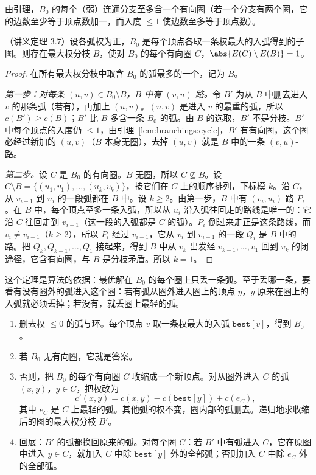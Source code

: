 由引理，$B_0$ 的每个（弱）连通分支至多含一个有向圈（若一个分支有两个圈，它的边数至少等于顶点数加一，而入度 $\leqslant1$ 使边数至多等于顶点数）。

\begin{theorem}\label{thm:branchings:one-arc}
（讲义定理 3.7）设各弧权为正，$B_0$ 是每个顶点各取一条权最大的入弧得到的子图。则存在最大权分枝 $B$，使对 $B_0$ 的每个有向圈 $C$，$\abs{E(C)\setminus E(B)}=1$。
\end{theorem}
\begin{proof}
在所有最大权分枝中取含 $B_0$ 的弧最多的一个，记为 $B$。

\emph{第一步：对每条 $(u,v)\in B_0\setminus B$，$B$ 中有 $(v,u)$-路。}令 $B'$ 为从 $B$ 中删去进入 $v$ 的那条弧（若有），再加上 $(u,v)$。$(u,v)$ 是进入 $v$ 的最重的弧，所以 $c(B')\geqslant c(B)$；$B'$ 比 $B$ 多含一条 $B_0$ 的弧。由 $B$ 的选取，$B'$ 不是分枝。$B'$ 中每个顶点的入度仍 $\leqslant1$，由引理~\ref{lem:branchings:cycle}，$B'$ 有有向圈，这个圈必经过新加的 $(u,v)$（$B$ 本身无圈），去掉 $(u,v)$ 就是 $B$ 中的一条 $(v,u)$-路。

\emph{第二步。}设 $C$ 是 $B_0$ 的有向圈。$B$ 无圈，所以 $C\not\subseteq B$。设 $C\setminus B=\{(u_1,v_1),\dots,(u_k,v_k)\}$，按它们在 $C$ 上的顺序排列，下标模 $k$。沿 $C$，从 $v_{i-1}$ 到 $u_i$ 的一段弧都在 $B$ 中。设 $k\geqslant2$。由第一步，$B$ 中有 $(v_i,u_i)$-路 $P_i$。在 $B$ 中，每个顶点至多一条入弧，所以从 $u_i$ 沿入弧往回走的路线是唯一的：它沿 $C$ 往回走到 $v_{i-1}$（这一段的入弧都是 $C$ 的弧）。$P_i$ 倒过来走正是这条路线，而 $v_i\neq v_{i-1}$（$k\geqslant2$），所以 $P_i$ 经过 $v_{i-1}$，它从 $v_i$ 到 $v_{i-1}$ 的一段 $Q_i$ 是 $B$ 中的路。把 $Q_k,Q_{k-1},\dots,Q_1$ 接起来，得到 $B$ 中从 $v_k$ 出发经 $v_{k-1},\dots,v_1$ 回到 $v_k$ 的闭途径，它含有向圈，与 $B$ 是分枝矛盾。所以 $k=1$。
\end{proof}

这个定理是算法的依据：最优解在 $B_0$ 的每个圈上只丢一条弧。至于丢哪一条，要看有没有圈外的弧进入这个圈：若有弧从圈外进入圈上的顶点 $y$，$y$ 原来在圈上的入弧就必须丢掉；若没有，就丢圈上最轻的弧。


\begin{enumerate}
\item 删去权 $\leqslant0$ 的弧与环。每个顶点 $v$ 取一条权最大的入弧 $\texttt{best}[v]$，得到 $B_0$。
\item 若 $B_0$ 无有向圈，它就是答案。
\item 否则，把 $B_0$ 的每个有向圈 $C$ 收缩成一个新顶点。对从圈外进入 $C$ 的弧 $(x,y)$，$y\in C$，把权改为
\[
c'(x,y)=c(x,y)-c(\texttt{best}[y])+c(e_C),
\]
其中 $e_C$ 是 $C$ 上最轻的弧。其他弧的权不变，圈内部的弧删去。递归地求收缩后的图的最大权分枝 $B'$。
\item 回展：$B'$ 的弧都换回原来的弧。对每个圈 $C$：若 $B'$ 中有弧进入 $C$，它在原图中进入 $y\in C$，就加入 $C$ 中除 $\texttt{best}[y]$ 外的全部弧；否则加入 $C$ 中除 $e_C$ 外的全部弧。
\end{enumerate}

